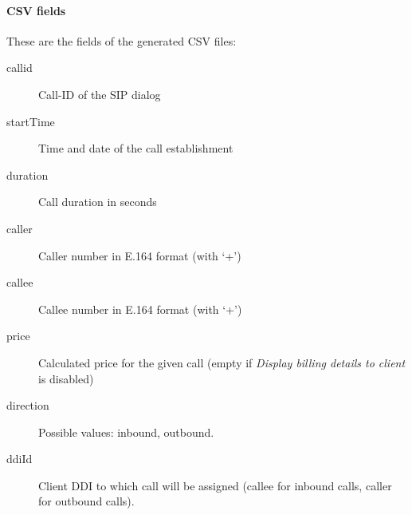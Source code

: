 \documentclass[letterpaper,10pt,spanish]{sphinxmanual}
\begin{document}
\paragraph{CSV fields}
\label{administration_portal/client/residential/calls/call_csv_schedulers:csv-fields}
These are the fields of the generated CSV files:
\begin{description}
\item[{callid}] \leavevmode{}\label{administration_portal/client/residential/calls/call_csv_schedulers:term-callid}
Call-ID of the SIP dialog

\item[{startTime}] \leavevmode{}\label{administration_portal/client/residential/calls/call_csv_schedulers:term-starttime}
Time and date of the call establishment

\item[{duration}] \leavevmode{}\label{administration_portal/client/residential/calls/call_csv_schedulers:term-duration}
Call duration in seconds

\item[{caller}] \leavevmode{}\label{administration_portal/client/residential/calls/call_csv_schedulers:term-caller}
Caller number in E.164 format (with `+')

\item[{callee}] \leavevmode{}\label{administration_portal/client/residential/calls/call_csv_schedulers:term-callee}
Callee number in E.164 format (with `+')

\item[{price}] \leavevmode{}\label{administration_portal/client/residential/calls/call_csv_schedulers:term-price}
Calculated price for the given call (empty if \emph{Display billing details to client} is disabled)

\item[{direction}] \leavevmode{}\label{administration_portal/client/residential/calls/call_csv_schedulers:term-16}
Possible values: inbound, outbound.

\item[{ddiId}] \leavevmode{}\label{administration_portal/client/residential/calls/call_csv_schedulers:term-ddiid}
Client DDI to which call will be assigned (callee for inbound calls, caller for outbound calls).


\end{description}
\end{document}
